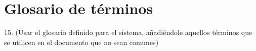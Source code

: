 \section*{{\large{Glosario de términos}}}


15. (Usar el glosario definido para el sistema, añadiéndole aquellos términos que se utilicen en el 
documento que no sean comunes)

\begin{acronym}
\end{acronym}

